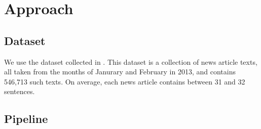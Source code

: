\section{Approach}

\subsection{Dataset}
We use the \newsspike{} dataset collected in \citet{zhang2013parallelparaphrase}.
This dataset is a collection of news article texts, all taken from the months of
Janurary and February in 2013, and contains 546,713 such texts. On average,
each news article contains between 31 and 32 sentences.

\subsection{Pipeline}
